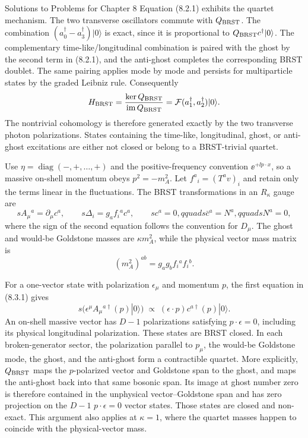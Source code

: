 \begin{bankssolutions}{Solutions to Problems for Chapter 8}
Equation (8.2.1) exhibits the quartet mechanism.  The two transverse
oscillators commute with $Q_{\rm BRST}$.  The combination
$(a_0^\dagger-a_3^\dagger)|0\rangle$ is exact, since it is proportional to
$Q_{\rm BRST}c^\dagger|0\rangle$.  The complementary time-like/longitudinal
combination is paired with the ghost by the second term in (8.2.1), and the
anti-ghost completes the corresponding BRST doublet.  The same pairing applies
mode by mode and persists for multiparticle states by the graded Leibniz rule.
Consequently
\[
  H_{\rm BRST}=\frac{\ker Q_{\rm BRST}}
  {\operatorname{im}Q_{\rm BRST}}
  =\mathcal F(a_1^\dagger,a_2^\dagger)|0\rangle .
\]
The nontrivial cohomology is therefore generated exactly by the two transverse
photon polarizations.  States containing the time-like, longitudinal, ghost,
or anti-ghost excitations are either not closed or belong to a BRST-trivial
quartet.

Use $\eta=\operatorname{diag}(-,+,\ldots,+)$ and the positive-frequency
convention $\ee^{+\ii p\cdot x}$, so a massive on-shell momentum obeys
$p^2=-m_A^2$.
Let $f^a{}_i=(T^a v)_i$ and retain only the terms linear in the fluctuations.
The BRST transformations in an $R_\kappa$ gauge are
\[
  sA_\mu{}^a=\partial_\mu c^a,\qquad
  s\Delta_i=g_af_i{}^a c^a,\qquad
  sc^a=0,qquad s\bar c^a=N^a,qquad sN^a=0,
  \tag{8.3.1}
\]
where the sign of the second equation follows the convention for $D_\mu$.
The ghost and would-be Goldstone masses are $\kappa m_A^2$, while the
physical vector mass matrix is
\[
  (m_A^2)^{ab}=g_ag_bf_i{}^af_i{}^b .
\]

For a one-vector state with polarization $\epsilon_\mu$ and momentum $p$,
the first equation in (8.3.1) gives
\[
  s\bigl(\epsilon^\mu A_\mu{}^{a\dagger}(p)|0\rangle\bigr)
  \;\propto\;(\epsilon\cdot p)c^{a\dagger}(p)|0\rangle .
\]
An on-shell massive vector has $D-1$ polarizations satisfying
$p\cdot\epsilon=0$, including its physical longitudinal polarization. These
states are BRST closed. In each broken-generator sector, the polarization
parallel to $p_\mu$, the would-be Goldstone mode, the ghost, and the anti-ghost
form a contractible quartet. More explicitly, $Q_{\rm BRST}$ maps the
$p$-polarized vector and Goldstone span to the ghost, and maps the anti-ghost
back into that same bosonic span. Its image at ghost number zero is therefore
contained in the unphysical vector--Goldstone span and has zero projection on
the $D-1$ $p\cdot\epsilon=0$ vector states. Those states are closed and
non-exact. This argument also applies at $\kappa=1$, where the quartet masses
happen to coincide with the physical-vector mass.


\end{bankssolutions}
